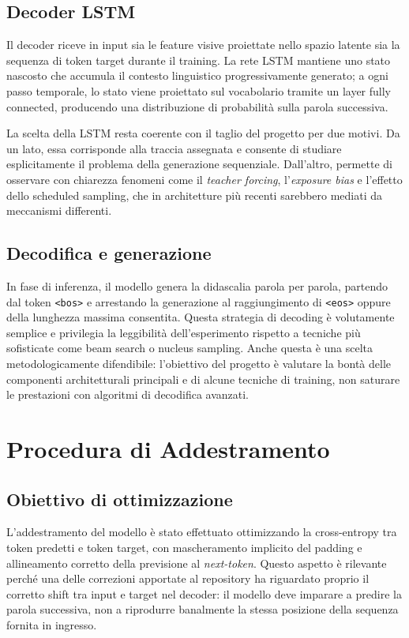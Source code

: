 \documentclass[11pt,a4paper]{report}
\newcommand{\bos}{\texttt{<bos>}}
\newcommand{\eos}{\texttt{<eos>}}
\begin{document}
\section{Decoder LSTM}

Il decoder riceve in input sia le feature visive proiettate nello spazio latente sia la sequenza di token target durante il training. La rete LSTM mantiene uno stato nascosto che accumula il contesto linguistico progressivamente generato; a ogni passo temporale, lo stato viene proiettato sul vocabolario tramite un layer fully connected, producendo una distribuzione di probabilità sulla parola successiva.

La scelta della LSTM resta coerente con il taglio del progetto per due motivi. Da un lato, essa corrisponde alla traccia assegnata e consente di studiare esplicitamente il problema della generazione sequenziale. Dall'altro, permette di osservare con chiarezza fenomeni come il \emph{teacher forcing}, l'\emph{exposure bias} e l'effetto dello scheduled sampling, che in architetture più recenti sarebbero mediati da meccanismi differenti.

\section{Decodifica e generazione}

In fase di inferenza, il modello genera la didascalia parola per parola, partendo dal token \bos{} e arrestando la generazione al raggiungimento di \eos{} oppure della lunghezza massima consentita. Questa strategia di decoding è volutamente semplice e privilegia la leggibilità dell'esperimento rispetto a tecniche più sofisticate come beam search o nucleus sampling. Anche questa è una scelta metodologicamente difendibile: l'obiettivo del progetto è valutare la bontà delle componenti architetturali principali e di alcune tecniche di training, non saturare le prestazioni con algoritmi di decodifica avanzati.

\chapter{Procedura di Addestramento}

\section{Obiettivo di ottimizzazione}

L'addestramento del modello è stato effettuato ottimizzando la cross-entropy tra token predetti e token target, con mascheramento implicito del padding e allineamento corretto della previsione al \emph{next-token}. Questo aspetto è rilevante perché una delle correzioni apportate al repository ha riguardato proprio il corretto shift tra input e target nel decoder: il modello deve imparare a predire la parola successiva, non a riprodurre banalmente la stessa posizione della sequenza fornita in ingresso.
\end{document}
